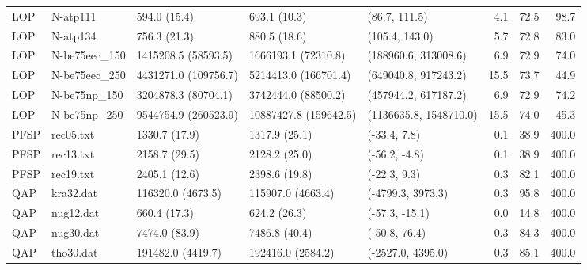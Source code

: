 \documentclass[runningheads]{llncs}
\begin{document}
{\begin{tabular}{lllllrrr}
    LOP &       N-atp111 &          594.0 (15.4) &           693.1 (10.3) &           (86.7, 111.5) &          4.1 &          72.5 &                 98.7 \\
    LOP &       N-atp134 &          756.3 (21.3) &           880.5 (18.6) &          (105.4, 143.0) &          5.7 &          72.8 &                 83.0 \\
    LOP &  N-be75eec\_150 &   1415208.5 (58593.5) &    1666193.1 (72310.8) &    (188960.6, 313008.6) &          6.9 &          72.9 &                 74.0 \\
    LOP &  N-be75eec\_250 &  4431271.0 (109756.7) &   5214413.0 (166701.4) &    (649040.8, 917243.2) &         15.5 &          73.7 &                 44.9 \\
    LOP &   N-be75np\_150 &   3204878.3 (80704.1) &    3742444.0 (88500.2) &    (457944.2, 617187.2) &          6.9 &          72.9 &                 74.2 \\
    LOP &   N-be75np\_250 &  9544754.9 (260523.9) &  10887427.8 (159642.5) &  (1136635.8, 1548710.0) &         15.5 &          74.0 &                 45.3 \\
   PFSP &      rec05.txt &         1330.7 (17.9) &          1317.9 (25.1) &            (-33.4, 7.8) &          0.1 &          38.9 &                400.0 \\
   PFSP &      rec13.txt &         2158.7 (29.5) &          2128.2 (25.0) &           (-56.2, -4.8) &          0.1 &          38.9 &                400.0 \\
   PFSP &      rec19.txt &         2405.1 (12.6) &          2398.6 (19.8) &            (-22.3, 9.3) &          0.3 &          82.1 &                400.0 \\
    QAP &      kra32.dat &     116320.0 (4673.5) &      115907.0 (4663.4) &       (-4799.3, 3973.3) &          0.3 &          95.8 &                400.0 \\
    QAP &      nug12.dat &          660.4 (17.3) &           624.2 (26.3) &          (-57.3, -15.1) &          0.0 &          14.8 &                400.0 \\
    QAP &      nug30.dat &         7474.0 (83.9) &          7486.8 (40.4) &           (-50.8, 76.4) &          0.3 &          84.3 &                400.0 \\
    QAP &      tho30.dat &     191482.0 (4419.7) &      192416.0 (2584.2) &       (-2527.0, 4395.0) &          0.3 &          85.1 &                400.0 \\
\bottomrule
\end{tabular}}
\end{document}
